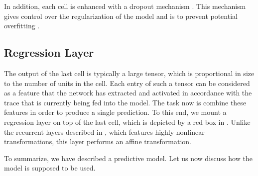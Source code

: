 In addition, each cell is enhanced with a dropout mechanism \cite{zaremba2014}.
This mechanism gives control over the regularization of the model and is to
prevent potential overfitting \cite{hastie2009}.

\subsection{Regression Layer}
The output of the last cell is typically a large tensor, which is proportional
in size to the number of units in the cell. Each entry of such a tensor can be
considered as a feature that the network has extracted and activated in
accordance with the trace that is currently being fed into the model. The task
now is combine these features in order to produce a single prediction. To this
end, we mount a regression layer on top of the last cell, which is depicted by a
red box in . Unlike the recurrent layers described in
, which features highly nonlinear transformations, this layer
performs an affine transformation.

To summarize, we have described a predictive model. Let us now discuss how the
model is supposed to be used.
